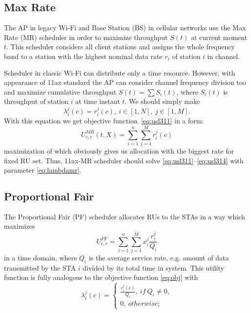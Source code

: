 \subsection{Max Rate}

The AP in legacy Wi-Fi and Base Station (BS) in cellular networks use the Max Rate (MR) scheduler in order to maximize  throughput $S(t)$ at current moment $t$. This scheduler considers all client stations and assigns the whole frequency band to a station with the highest nominal data rate $r_i$ of station $i$ in channel.

Scheduler in classic Wi-Fi сan distribute only a time resource.
However, with appearance of 11ax standard the AP can consider channel frequency division too and maximize cumulative throughput $S(t) = \sum S_i(t)$, where $S_i(t)$ is throughput of station $i$ at time instant $t$. We should simply make   
\begin{equation}
\label{eq:lambdamr}
\lambda_i^j (c) = r_i^j (c),\ i \in [1,N],\ j \in [1, M].
\end{equation}
With this equation we get objective function~\eqref{eq:usl311} in a form:
\begin{equation}
\label{eq:11axmrutility}
U^{MR}_{c,r}(t,X) = \sum_{i = 1}^{n} \sum_{j = 1}^{M} r_i^j (c)
\end{equation}
maximization of which obviously gives us allocation with the biggest rate for fixed RU set. Thus, 11ax-MR scheduler should solve \eqref{eq:usl311}--\eqref{eq:usl314} with parameter \eqref{eq:lambdamr}.

\subsection{Proportional Fair}

The Proportional Fair (PF) scheduler allocates RUs to the STAs in a way which maximizes 
\begin{equation}
\label{eq:11axpfutility}
U_{c,r}^{PF} = \sum_{i=1}^{n}\sum_{j=1}^{M} x_i^j \frac{r_i^j}{Q_i}
\end{equation}
in a time domain, where $Q_i$ is the average service rate, e.g. amount of data transmitted by the STA $i$ divided by its total time in system. This utility function is fully analogous to the objective function \eqref{eq:obj} with
\begin{equation}
\label{eq:pflambda}
\lambda_i^j (c) = \begin{cases}
\frac{r_i^j(c)}{Q_i},\ if\ Q_i \ne 0,\\
0,\ otherwise;
\end{cases}
\end{equation}

